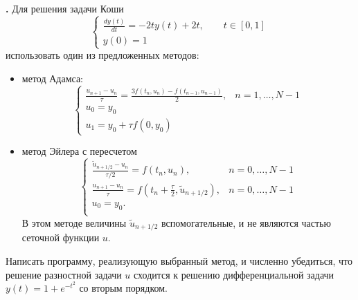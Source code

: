 \documentclass[12pt]{article}
\newcounter{task}
\newcommand{\problem}{\par\textbf{\stepcounter{task}\thetask. }}
\begin{document}
\problem Для решения задачи Коши
\[
\begin{cases}
\displaystyle\frac{dy(t)}{dt} = -2t y(t) + 2 t, \qquad t \in [0,1]\\
y(0) = 1
\end{cases}
\]
использовать один из предложенных методов:
\begin{itemize}
\item метод Адамса:
\[
\begin{cases}
\displaystyle\frac{u_{n+1} - u_{n}}{\tau} = \frac{3 f(t_n, u_n) - f(t_{n-1}, u_{n-1})}{2}, & n =
1,\dots, N-1\\
u_0 = y_0\\
u_1 = y_0 + \tau f(0, y_0)
\end{cases}
\]
\item метод Эйлера с пересчетом
\[
\begin{cases}
\displaystyle\frac{\tilde u_{n+1/2} - u_{n}}{\tau/2} = f(t_n, u_n), &n =
0,\dots, N-1\\
\displaystyle\frac{u_{n+1} - u_{n}}{\tau} = 
f\left(t_n + \frac{\tau}{2}, \tilde u_{n+1/2}\right), &n =
0,\dots, N-1\\
u_0 = y_0.\\
\end{cases}
\]
В этом методе величины $\tilde u_{n+1/2}$ вспомогательные, и не являются частью сеточной функции $u$.
\end{itemize}

Написать программу, реализующую выбранный метод, и численно убедиться, что решение
разностной задачи $u$ сходится к решению дифференциальной задачи $y(t) = 1 + e^{-t^2}$ со вторым порядком.
\end{document}
